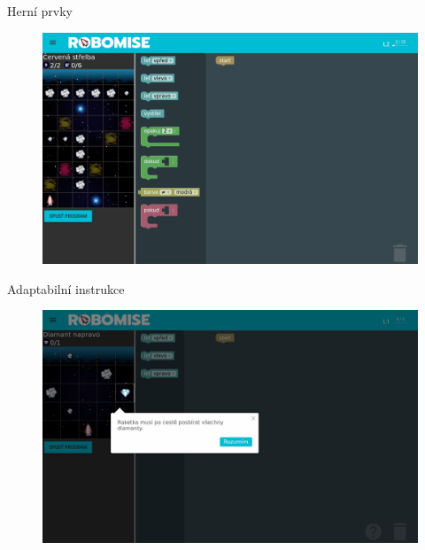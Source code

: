 \documentclass[
]{beamer}
\begin{document}
\begin{frame}{Herní prvky}
\begin{figure}
\includegraphics[width=\textwidth,height=.75\textheight,keepaspectratio]{../img/robomission-task3}
\end{figure}
\end{frame}

\begin{frame}{Adaptabilní instrukce}
\begin{figure}
\includegraphics[width=\textwidth,height=.75\textheight,keepaspectratio]{../img/robomission-mini-instruction}
\end{figure}
\end{frame}
\end{document}
